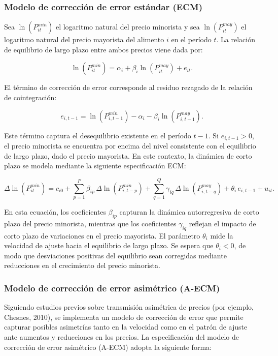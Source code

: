 \documentclass[
  12pt,
]{article}
\begin{document}
\subsubsection{Modelo de corrección de error estándar
(ECM)}\label{modelo-de-correcciuxf3n-de-error-estuxe1ndar-ecm}

Sea \(\ln(P_{it}^{min})\) el logaritmo natural del precio minorista y
sea \(\ln(P_{it}^{may})\) el logaritmo natural del precio mayorista del
alimento \(i\) en el período \(t\). La relación de equilibrio de largo
plazo entre ambos precios viene dada por:

\[
\ln(P_{it}^{min}) = \alpha_i + \beta_i \ln(P_{it}^{may}) + e_{it}.
\]

El término de corrección de error corresponde al residuo rezagado de la
relación de cointegración:

\[
e_{i,t-1} = \ln(P_{i,t-1}^{min}) - \alpha_i - \beta_i \ln(P_{i,t-1}^{may}).
\]

Este término captura el desequilibrio existente en el período \(t-1\).
Si \(e_{i,t-1} > 0\), el precio minorista se encuentra por encima del
nivel consistente con el equilibrio de largo plazo, dado el precio
mayorista. En este contexto, la dinámica de corto plazo se modela
mediante la siguiente especificación ECM:

\[
\Delta \ln(P_{it}^{min}) =
c_{i0}
+ \sum_{p=1}^{P} \beta_{ip} \, \Delta \ln(P_{i,t-p}^{min})
+ \sum_{q=1}^{Q} \gamma_{iq} \, \Delta \ln(P_{i,t-q}^{may})
+ \theta_i \, e_{i,t-1}
+ u_{it}.
\]

En esta ecuación, los coeficientes \(\beta_{ip}\) capturan la dinámica
autorregresiva de corto plazo del precio minorista, mientras que los
coeficientes \(\gamma_{iq}\) reflejan el impacto de corto plazo de
variaciones en el precio mayorista. El parámetro \(\theta_i\) mide la
velocidad de ajuste hacia el equilibrio de largo plazo. Se espera que
\(\theta_i < 0\), de modo que desviaciones positivas del equilibrio sean
corregidas mediante reducciones en el crecimiento del precio minorista.

\subsubsection{Modelo de corrección de error asimétrico
(A-ECM)}\label{modelo-de-correcciuxf3n-de-error-asimuxe9trico-a-ecm}

Siguiendo estudios previos sobre transmisión asimétrica de precios (por
ejemplo, Chesnes, 2010), se implementa un modelo de corrección de error
que permite capturar posibles asimetrías tanto en la velocidad como en
el patrón de ajuste ante aumentos y reducciones en los precios. La
especificación del modelo de corrección de error asimétrico (A-ECM)
adopta la siguiente forma:
\end{document}
